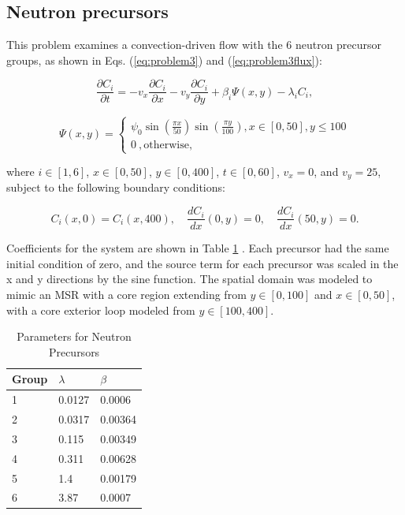 \subsection{Neutron precursors}
This problem examines a convection-driven flow with the 6 neutron precursor groups, as shown in Eqs. (\ref{eq:problem3}) and (\ref{eq:problem3flux}): 

\begin{equation}
\frac{\partial C_{i}}{\partial t} = -v_{x}\frac{\partial C_{i}}{\partial x} - v_{y}\frac{\partial C_{i}}{\partial y} + \beta_{i} \Psi (x, y) -\lambda_i C_{i},
\label{eq:problem3}
\end{equation}

\begin{equation}
\Psi (x, y) = \begin{cases}
  \psi _0 \sin\left(\frac{\pi x}{50}\right)\sin\left(\frac{\pi y}{100}\right) , x \in [0,50], y \le 100 \\
  0\ , \text{otherwise},
  \label{eq:problem3flux}
\end{cases}
\end{equation}

\noindent where $i \in [1,6]$, $x \in [0, 50]$, $y \in [0, 400]$, $t \in [0, 60]$, $v_{x} = 0$, and $v_{y} = 25$, subject to the following boundary conditions:

\begin{equation}
    C_{i}(x,0) = C_{i}(x,400), \quad \frac{dC_{i}}{dx}(0,y) = 0, \quad \frac{dC_{i}}{dx}(50, y) = 0.
\end{equation}

Coefficients for the system are shown in Table \ref{tab:precursorCoeffs} \cite{ott1985}. 
Each precursor had the same initial condition of zero, and the source term for each precursor was scaled in the x and y directions by the sine function. The spatial domain was modeled to mimic an MSR with a core region extending from $y \in [0,100]$ and $x \in [0,50]$, with a core exterior loop modeled from $y \in [100, 400]$. 

\begin{table}[h!]
   \caption{\label{tab:precursorCoeffs} Parameters for Neutron Precursors}
   \centering
   \begin{tabular}{lll}
   \hline
   Group & $\lambda$ & $\beta$ \\
   \hline
   1 & 0.0127 & 0.0006 \\
   2 & 0.0317 & 0.00364 \\
   3 & 0.115 & 0.00349 \\
   4 & 0.311& 0.00628 \\
   5 & 1.4 & 0.00179\\
   6 & 3.87 & 0.0007 \\
   \hline
   \end{tabular}
\end{table}     


